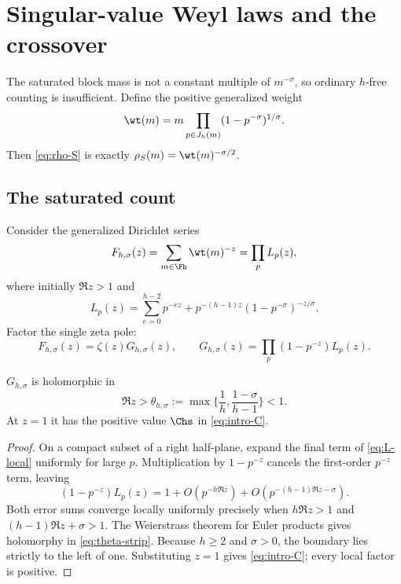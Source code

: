 \section{Singular-value Weyl laws and the crossover}
\label{sec:weyl}

The saturated block mass is not a constant multiple of
$m^{-\sigma}$, so ordinary $h$-free counting is insufficient.  Define the
positive generalized weight
\begin{equation}
  \wt(m)=m\prod_{p\in J_h(m)}(1-p^{-\sigma})^{1/\sigma}.
  \label{eq:generalized-weight}
\end{equation}
Then \cref{eq:rho-S} is exactly
$\rho_S(m)=\wt(m)^{-\sigma/2}$.

\subsection{The saturated count}

Consider the generalized Dirichlet series
\begin{equation}
  F_{h,\sigma}(z)=\sum_{m\in\Fh}\wt(m)^{-z}
  =\prod_p L_p(z),
  \label{eq:F-series}
\end{equation}
where initially $\Re z>1$ and
\begin{equation}
  L_p(z)=\sum_{e=0}^{h-2}p^{-ez}
    +p^{-(h-1)z}(1-p^{-\sigma})^{-z/\sigma}.
  \label{eq:L-local}
\end{equation}
Factor the single zeta pole:
\begin{equation}
  F_{h,\sigma}(z)=\zeta(z)G_{h,\sigma}(z),
  \qquad
  G_{h,\sigma}(z)=\prod_p(1-p^{-z})L_p(z).
  \label{eq:F-factorization}
\end{equation}

\begin{lemma}
\label{lem:tauberian-strip}
$G_{h,\sigma}$ is holomorphic in
\begin{equation}
  \Re z>\theta_{h,\sigma}
    :=\max\{\frac1h,\frac{1-\sigma}{h-1}\}<1.
  \label{eq:theta-strip}
\end{equation}
At $z=1$ it has the positive value $\Chs$ in
\cref{eq:intro-C}.
\end{lemma}

\begin{proof}
On a compact subset of a right half-plane, expand the final term of
\cref{eq:L-local} uniformly for large $p$.  Multiplication by
$1-p^{-z}$ cancels the first-order $p^{-z}$ term, leaving
\begin{equation}
  (1-p^{-z})L_p(z)
  =1+O(p^{-h\Re z})
      +O(p^{-(h-1)\Re z-\sigma}).
  \label{eq:local-cancellation}
\end{equation}
Both error sums converge locally uniformly precisely when
$h\Re z>1$ and $(h-1)\Re z+\sigma>1$.  The Weierstrass theorem for
Euler products gives holomorphy in \cref{eq:theta-strip}.  Because
$h\ge2$ and $\sigma>0$, the boundary lies strictly to the left of one.
Substituting $z=1$ gives \cref{eq:intro-C}; every local factor is positive.
\end{proof}

